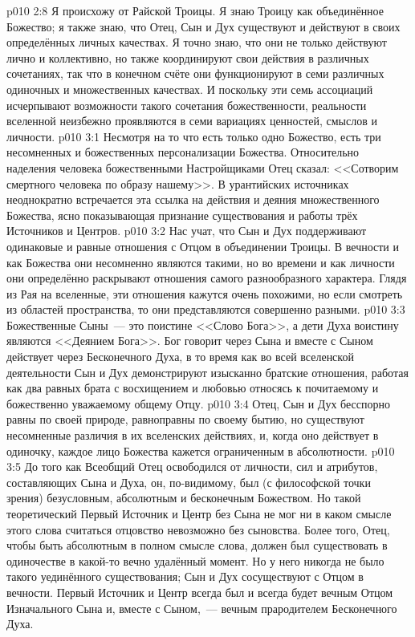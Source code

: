\vs p010 2:8 Я происхожу от Райской Троицы. Я знаю Троицу как объединённое Божество; я также знаю, что Отец, Сын и Дух существуют и действуют в своих определённых личных качествах. Я точно знаю, что они не только действуют лично и коллективно, но также координируют свои действия в различных сочетаниях, так что в конечном счёте они функционируют в семи различных одиночных и множественных качествах. И поскольку эти семь ассоциаций исчерпывают возможности такого сочетания божественности, реальности вселенной неизбежно проявляются в семи вариациях ценностей, смыслов и личности.
\vs p010 3:1 Несмотря на то что есть только одно Божество, есть три несомненных и божественных персонализации Божества. Относительно наделения человека божественными Настройщиками Отец сказал: <<Сотворим смертного человека по образу нашему>>. В урантийских источниках неоднократно встречается эта ссылка на действия и деяния множественного Божества, ясно показывающая признание существования и работы трёх Источников и Центров.
\vs p010 3:2 \pc Нас учат, что Сын и Дух поддерживают одинаковые и равные отношения с Отцом в объединении Троицы. В вечности и как Божества они несомненно являются такими, но во времени и как личности они определённо раскрывают отношения самого разнообразного характера. Глядя из Рая на вселенные, эти отношения кажутся очень похожими, но если смотреть из областей пространства, то они представляются совершенно разными.
\vs p010 3:3 Божественные Сыны~--- это поистине <<Слово Бога>>, а дети Духа воистину являются <<Деянием Бога>>. Бог говорит через Сына и вместе с Сыном действует через Бесконечного Духа, в то время как во всей вселенской деятельности Сын и Дух демонстрируют изысканно братские отношения, работая как два равных брата с восхищением и любовью относясь к почитаемому и божественно уважаемому общему Отцу.
\vs p010 3:4 Отец, Сын и Дух бесспорно равны по своей природе, равноправны по своему бытию, но существуют несомненные различия в их вселенских действиях, и, когда оно действует в одиночку, каждое лицо Божества кажется ограниченным в абсолютности.
\vs p010 3:5 \pc До того как Всеобщий Отец освободился от личности, сил и атрибутов, составляющих Сына и Духа, он, по\hyp{}видимому, был (с философской точки зрения) безусловным, абсолютным и бесконечным Божеством. Но такой теоретический Первый Источник и Центр без Сына не мог ни в каком смысле этого слова считаться  отцовство невозможно без сыновства. Более того, Отец, чтобы быть абсолютным в полном смысле слова, должен был существовать в одиночестве в какой\hyp{}то вечно удалённый момент. Но у него никогда не было такого уединённого существования; Сын и Дух сосуществуют с Отцом в вечности. Первый Источник и Центр всегда был и всегда будет вечным Отцом Изначального Сына и, вместе с Сыном,~--- вечным прародителем Бесконечного Духа.
